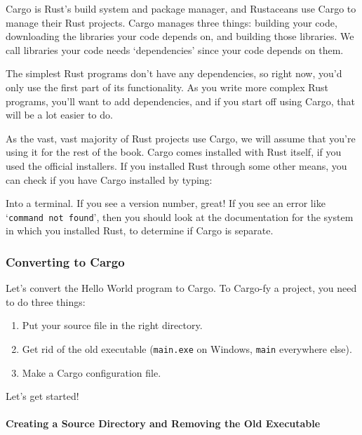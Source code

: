 \documentclass[a4paper,]{book}
\newenvironment{Shaded}{\begin{snugshade}}{\end{snugshade}}
\newcommand{\KeywordTok}[1]{\textcolor[rgb]{0.13,0.29,0.53}{\textbf{{#1}}}}
\newcommand{\NormalTok}[1]{{#1}}
\providecommand{\tightlist}{%
  \setlength{\itemsep}{0pt}\setlength{\parskip}{0pt}}
\let\oldparagraph\paragraph
\renewcommand{\paragraph}[1]{\oldparagraph{#1}\mbox{}}
\begin{document}
Cargo is Rust's build system and package manager, and Rustaceans use
Cargo to manage their Rust projects. Cargo manages three things:
building your code, downloading the libraries your code depends on, and
building those libraries. We call libraries your code needs
`dependencies' since your code depends on them.

The simplest Rust programs don't have any dependencies, so right now,
you'd only use the first part of its functionality. As you write more
complex Rust programs, you'll want to add dependencies, and if you start
off using Cargo, that will be a lot easier to do.

As the vast, vast majority of Rust projects use Cargo, we will assume
that you're using it for the rest of the book. Cargo comes installed
with Rust itself, if you used the official installers. If you installed
Rust through some other means, you can check if you have Cargo installed
by typing:

\begin{Shaded}
\end{Shaded}

Into a terminal. If you see a version number, great! If you see an error
like `\texttt{command\ not\ found}', then you should look at the
documentation for the system in which you installed Rust, to determine
if Cargo is separate.

\subsubsection{Converting to Cargo}\label{converting-to-cargo}

Let's convert the Hello World program to Cargo. To Cargo-fy a project,
you need to do three things:

\begin{enumerate}
\def\labelenumi{\arabic{enumi}.}
\tightlist
\item
  Put your source file in the right directory.
\item
  Get rid of the old executable (\texttt{main.exe} on Windows,
  \texttt{main} everywhere else).
\item
  Make a Cargo configuration file.
\end{enumerate}

Let's get started!

\paragraph{Creating a Source Directory and Removing the Old
Executable}\label{creating-a-source-directory-and-removing-the-old-executable}
\end{document}
